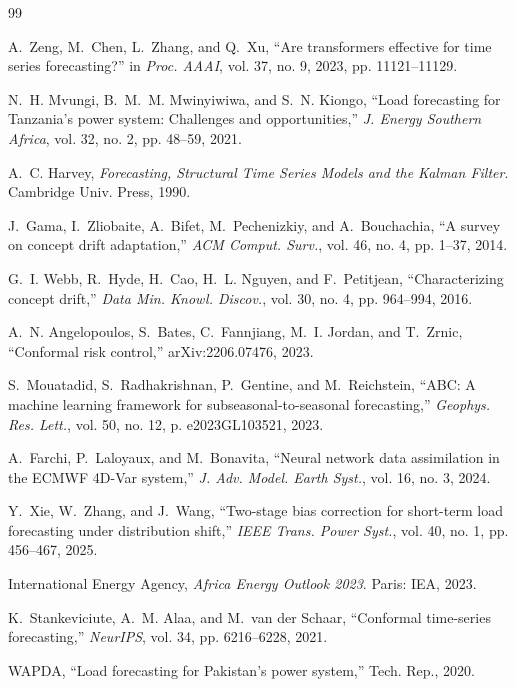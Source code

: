\documentclass[11pt,letterpaper]{article}
\begin{document}
\begin{thebibliography}{99}

A.~Zeng, M.~Chen, L.~Zhang, and Q.~Xu, ``Are transformers effective for time series forecasting?'' in \emph{Proc. AAAI}, vol. 37, no. 9, 2023, pp. 11121--11129.

N.~H. Mvungi, B.~M.~M. Mwinyiwiwa, and S.~N. Kiongo, ``Load forecasting for Tanzania's power system: Challenges and opportunities,'' \emph{J. Energy Southern Africa}, vol. 32, no. 2, pp. 48--59, 2021.

A.~C. Harvey, \emph{Forecasting, Structural Time Series Models and the Kalman Filter}. Cambridge Univ. Press, 1990.

J.~Gama, I.~Zliobaite, A.~Bifet, M.~Pechenizkiy, and A.~Bouchachia, ``A survey on concept drift adaptation,'' \emph{ACM Comput. Surv.}, vol. 46, no. 4, pp. 1--37, 2014.

G.~I. Webb, R.~Hyde, H.~Cao, H.~L. Nguyen, and F.~Petitjean, ``Characterizing concept drift,'' \emph{Data Min. Knowl. Discov.}, vol. 30, no. 4, pp. 964--994, 2016.

A.~N. Angelopoulos, S.~Bates, C.~Fannjiang, M.~I. Jordan, and T.~Zrnic, ``Conformal risk control,'' arXiv:2206.07476, 2023.

S.~Mouatadid, S.~Radhakrishnan, P.~Gentine, and M.~Reichstein, ``ABC: A machine learning framework for subseasonal-to-seasonal forecasting,'' \emph{Geophys. Res. Lett.}, vol. 50, no. 12, p. e2023GL103521, 2023.

A.~Farchi, P.~Laloyaux, and M.~Bonavita, ``Neural network data assimilation in the ECMWF 4D-Var system,'' \emph{J. Adv. Model. Earth Syst.}, vol. 16, no. 3, 2024.

Y.~Xie, W.~Zhang, and J.~Wang, ``Two-stage bias correction for short-term load forecasting under distribution shift,'' \emph{IEEE Trans. Power Syst.}, vol. 40, no. 1, pp. 456--467, 2025.

International Energy Agency, \emph{Africa Energy Outlook 2023}. Paris: IEA, 2023.

K.~Stankeviciute, A.~M. Alaa, and M.~van der Schaar, ``Conformal time-series forecasting,'' \emph{NeurIPS}, vol. 34, pp. 6216--6228, 2021.

WAPDA, ``Load forecasting for Pakistan's power system,'' Tech. Rep., 2020.


\end{thebibliography}
\end{document}
